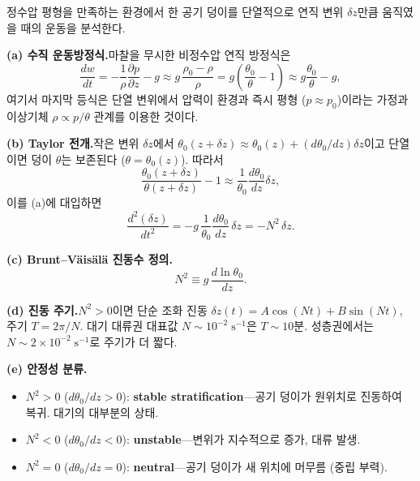 \begin{example}\label{ex:ch04_hw7_bv}
정수압 평형을 만족하는 환경에서 한 공기 덩이를 단열적으로 연직 변위
$\delta z$만큼 움직였을 때의 운동을 분석한다.

\smallskip
\textbf{(a) 수직 운동방정식.}\quad 마찰을 무시한 비정수압 연직 방정식은
\[
  \frac{dw}{dt} = -\frac{1}{\rho}\frac{\partial p}{\partial z} - g
  \approx g\,\frac{\rho_0 - \rho}{\rho}
  = g\!\left(\frac{\theta_0}{\theta} - 1\right) \approx g\frac{\theta_0}{\theta} - g,
\]
여기서 마지막 등식은 단열 변위에서 압력이 환경과 즉시 평형
($p \approx p_0$)이라는 가정과 이상기체 $\rho \propto p/\theta$ 관계를
이용한 것이다.

\smallskip
\textbf{(b) Taylor 전개.}\quad 작은 변위 $\delta z$에서
$\theta_0(z+\delta z) \approx \theta_0(z) + (d\theta_0/dz)\delta z$이고
단열이면 덩이 $\theta$는 보존된다 ($\theta = \theta_0(z)$).  따라서
\[
  \frac{\theta_0(z+\delta z)}{\theta(z+\delta z)} - 1
  \approx \frac{1}{\theta_0}\frac{d\theta_0}{dz}\delta z,
\]
이를 (a)에 대입하면
\[
  \frac{d^2(\delta z)}{dt^2}
  = -g\,\frac{1}{\theta_0}\frac{d\theta_0}{dz}\,\delta z
  = -N^2\,\delta z.
\]

\smallskip
\textbf{(c) Brunt--V\"ais\"al\"a 진동수 정의.}
\begin{equation}\label{eq:ch04_BV_def}
  \boxed{\,N^2 \equiv g\,\frac{d\ln\theta_0}{dz}.\,}
\end{equation}

\smallskip
\textbf{(d) 진동 주기.}\quad $N^2 > 0$이면 단순 조화 진동
$\delta z(t) = A\cos(Nt) + B\sin(Nt)$, 주기 $T = 2\pi/N$.
대기 대류권 대표값 $N \sim 10^{-2}\;\text{s}^{-1}$은 $T \sim 10$분.
성층권에서는 $N \sim 2\times 10^{-2}\;\text{s}^{-1}$로 주기가 더 짧다.

\smallskip
\textbf{(e) 안정성 분류.}\quad
\begin{itemize}
  \item $N^2 > 0$ ($d\theta_0/dz > 0$): \textbf{stable stratification}---공기 덩이가
        원위치로 진동하여 복귀.  대기의 대부분의 상태.
  \item $N^2 < 0$ ($d\theta_0/dz < 0$): \textbf{unstable}---변위가
        지수적으로 증가, 대류 발생.
  \item $N^2 = 0$ ($d\theta_0/dz = 0$): \textbf{neutral}---공기 덩이가
        새 위치에 머무름 (중립 부력).
\end{itemize}
\end{example}


